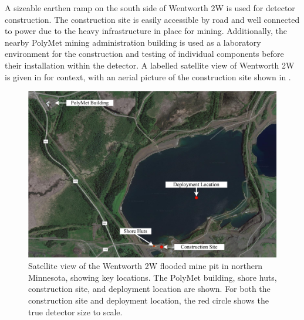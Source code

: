 A sizeable earthen ramp on the south side of Wentworth 2W is used for detector construction. The
construction site is easily accessible by road and well connected to power due to the heavy
infrastructure in place for mining. Additionally, the nearby PolyMet mining administration
building is used as a laboratory environment for the construction and testing of individual
components before their installation within the detector. A labelled satellite view of Wentworth
2W is given in  for context, with an aerial picture of the construction site
shown in .

\begin{figure} %
    \includegraphics[width=\textwidth]{diagrams/4-chips/pit.pdf}
    \caption[Satellite view of the Wentworth 2W mine pit in northern Minnesota]
    {Satellite view of the Wentworth 2W flooded mine pit in northern Minnesota, showing key
        \chipsfive locations. The PolyMet building, shore huts, construction site, and deployment
        location are shown. For both the construction site and deployment location, the red circle
        shows the true \chipsfive detector size to scale.}
    \label{fig:pit}
\end{figure}

